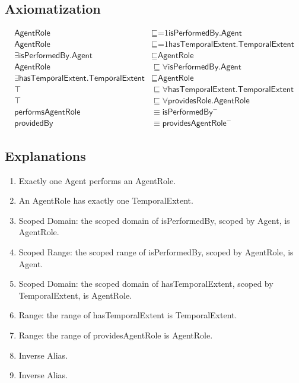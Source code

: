 \subsection{Axiomatization}
\label{axs:AgentRole}
\begin{align}
\textsf{AgentRole} &\sqsubseteq \text{=1}\textsf{isPerformedBy.Agent} \\
\textsf{AgentRole} &\sqsubseteq \text{=1}\textsf{hasTemporalExtent.TemporalExtent} \\
\exists\textsf{isPerformedBy.Agent} &\sqsubseteq \textsf{AgentRole} \\
\textsf{AgentRole} &\sqsubseteq \forall\textsf{isPerformedBy.Agent} \\
\exists\textsf{hasTemporalExtent.TemporalExtent} &\sqsubseteq \textsf{AgentRole} \\
\top &\sqsubseteq \forall\textsf{hasTemporalExtent.TemporalExtent} \\
\top &\sqsubseteq \forall\textsf{providesRole.AgentRole} \\
\textsf{performsAgentRole} &\equiv \textsf{isPerformedBy}^- \\
\textsf{providedBy} &\equiv \textsf{providesAgentRole}^-
\end{align}

\subsection{Explanations}
\label{exp:AgentRole}
\begin{enumerate}
\item Exactly one \textsf{Agent} performs an \textsf{AgentRole}.
\item An \textsf{AgentRole} has exactly one \textsf{TemporalExtent}.
\item Scoped Domain: the scoped domain of \textsf{isPerformedBy}, scoped by \textsf{Agent}, is \textsf{AgentRole}.
\item Scoped Range: the scoped range of \textsf{isPerformedBy}, scoped by \textsf{AgentRole}, is \textsf{Agent}. 
\item Scoped Domain: the scoped domain of \textsf{hasTemporalExtent}, scoped by \textsf{TemporalExtent}, is \textsf{AgentRole}.
\item Range: the range of \textsf{hasTemporalExtent} is \textsf{TemporalExtent}.
\item Range:  the range of \textsf{providesAgentRole} is \textsf{AgentRole}.
\item Inverse Alias.
\item Inverse Alias.
\end{enumerate}

